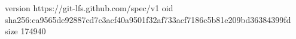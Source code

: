 version https://git-lfs.github.com/spec/v1
oid sha256:ca9565de92887cd7c3acf40a9501f32af733acf7186c5b81e209bd36384399fd
size 174940
